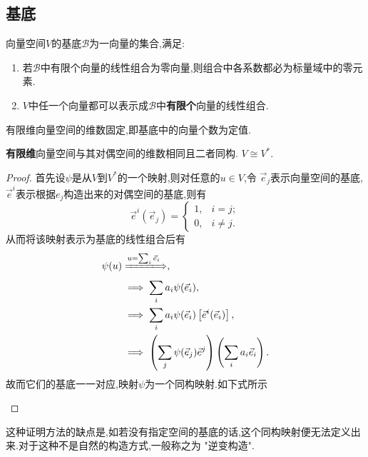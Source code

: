 \subsection{基底}
\begin{definition}
  向量空间$V$的基底$\mathscr{B}$为一向量的集合,满足:
  \begin{enumerate}
    \item 若$\mathscr{B}$中有限个向量的线性组合为零向量,则组合中各系数都必为标量域中的零元素.
    \item $V$中任一个向量都可以表示成$\mathscr{B}$中\textbf{有限个}向量的线性组合.
  \end{enumerate}
\end{definition}
\begin{proposition}[][prop:1.3.1]
  有限维向量空间的维数固定,即基底中的向量个数为定值.
\end{proposition}
\begin{proposition}[][prop:1.3.2]
\textbf{有限维}向量空间与其对偶空间的维数相同且二者同构. $V\cong V^{*}$.
\end{proposition}
\begin{proof}
  首先设$\psi$是从$V$到$V^*$的一个映射,则对任意的$u\in V$,令
  $\vec{e}_j$表示向量空间的基底,$\vec{e}^i$表示根据$e_j$构造出来的对偶空间的基底,则有
  \begin{equation}
\label{eq:jidi}
\vec{e}^i (\vec{e}_j)=\begin{cases}
  1,&i=j;\\
  0,&i\neq j.
\end{cases}
  \end{equation}
从而将该映射表示为基底的线性组合后有
  \begin{equation*}
    \begin{split}
      \psi(u)&\xLongrightarrow[]{u=\sum_i \vec{e}_i},\\
      &\implies \sum_i a_i \psi(\vec{e}_i),\\
      &\implies \sum_i a_i \psi(\vec{e}_i) \left[\vec{e}^i (\vec{e}_i)\right],\\
      &\implies \left(\sum_j \psi (\vec{e}_j)\vec{e}^j\right)\left(\sum_i a_i \vec{e}_i\right).
    \end{split}
  \end{equation*}
故而它们的基底一一对应,映射$\psi$为一个同构映射.如下式所示
\begin{center}
\end{center}

\end{proof}
\begin{remark}
  这种证明方法的缺点是,如若没有指定空间的基底的话,这个同构映射便无法定义出来.对于这种不是自然的构造方式,一般称之为 "逆变构造".
\end{remark}
